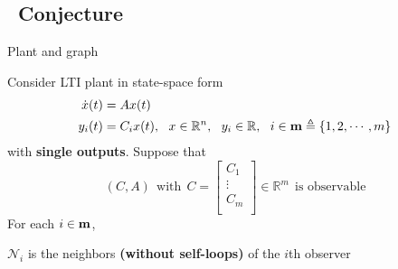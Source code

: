\documentclass{beamer}
\newcommand{\R}{\mathbb{R}}
\begin{document}
\subsection{~Conjecture}%

\begin{frame}{\color{blue} Plant and graph}

Consider LTI plant in state-space form
\begin{align*}
\dot{x}(t)&=A x(t) \\
y_{i}(t)&=C_{i}x(t),~~ x\in\R^{n},~~ y_{i}\in\R,~~ i\in{\bf m}\triangleq \{1,2,\cdots,m\}
\end{align*}
with \textbf{single outputs}. Suppose that
\begin{equation*}
(C,A) ~~\text{with}~~ C=\begin{bmatrix} C_{1} \\ \vdots \\ C_{m} \\   \end{bmatrix}\in\R^{m} ~~\text{is observable}
\end{equation*}
For each $i\in{\bf m}$,
\begin{center}
$\mathcal{N}_{i}$ is the neighbors \textbf{(without self-loops)} of the $i$th observer
\end{center}
\end{frame}
\end{document}
